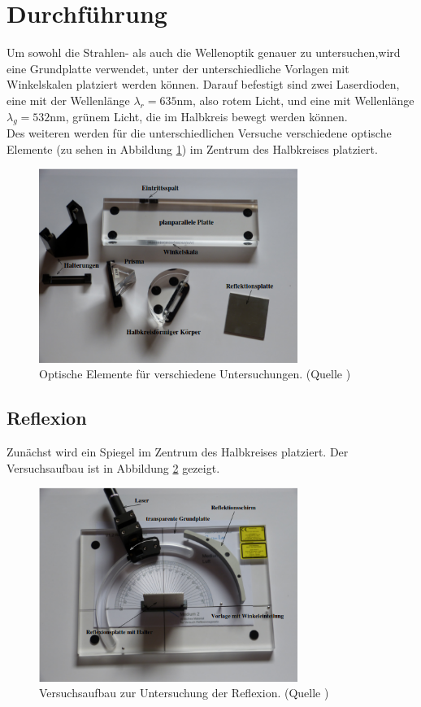 \section{Durchführung}
\label{sec:Durchführung}
Um sowohl die Strahlen- als auch die Wellenoptik genauer zu untersuchen,wird
eine Grundplatte verwendet, unter der unterschiedliche Vorlagen mit Winkelskalen
platziert werden können. Darauf befestigt sind zwei Laserdioden, eine mit der 
Wellenlänge $\lambda_r = 635 \si{\nano\m}$, also rotem Licht, und eine mit
Wellenlänge $\lambda_g = 532 \si{\nano\m}$, grünem Licht, die im 
Halbkreis bewegt werden können.\\
Des weiteren werden für die unterschiedlichen Versuche verschiedene optische
Elemente (zu sehen in Abbildung \ref{fig:elemente}) im Zentrum des Halbkreises platziert.

\begin{figure}
    \centering
    \includegraphics[width=0.75\textwidth]{werkzeug.png}
    \caption{Optische Elemente für verschiedene Untersuchungen. (Quelle \cite{versuch})}
    \label{fig:elemente}
\end{figure}

\subsection{Reflexion}
Zunächst wird ein Spiegel im Zentrum des Halbkreises platziert. Der Versuchsaufbau
ist in Abbildung \ref{fig:aufbau} gezeigt.

\begin{figure}
    \centering
    \includegraphics[width=0.75\textwidth]{aufbauuu.png}
    \caption{Versuchsaufbau zur Untersuchung der Reflexion. (Quelle \cite{versuch})}
    \label{fig:aufbau}
\end{figure}

